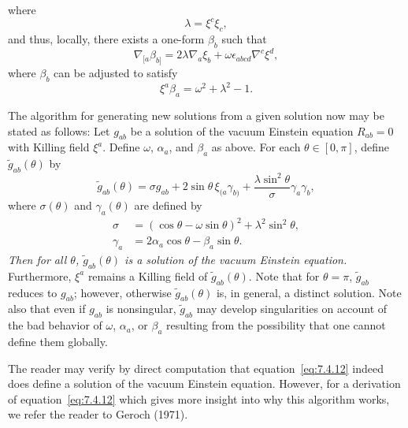 where
\begin{equation}
  \lambda=\xi^c\xi_c ,
  \tag{7.4.9}\label{eq:7.4.9}
\end{equation}
and thus, locally, there exists a one-form \(\beta_b\) such that
\begin{equation}
  \nabla_{[a}\beta_{b]}
    =2\lambda\nabla_a\xi_b
      +\omega\epsilon_{abcd}\nabla^c\xi^d ,
  \tag{7.4.10}\label{eq:7.4.10}
\end{equation}
where \(\beta_b\) can be adjusted to satisfy
\begin{equation}
  \xi^a\beta_a=\omega^2+\lambda^2-1 .
  \tag{7.4.11}\label{eq:7.4.11}
\end{equation}

The algorithm for generating new solutions from a given solution now may be stated
as follows: Let \(g_{ab}\) be a solution of the vacuum Einstein equation \(R_{ab}=0\)
with Killing field \(\xi^a\). Define \(\omega\), \(\alpha_a\), and \(\beta_a\) as
above. For each \(\theta\in[0,\pi]\), define \(\widetilde g_{ab}(\theta)\) by
\begin{equation}
  \widetilde g_{ab}(\theta)
    =\sigma g_{ab}
      +2\sin\theta\,\xi_{(a}\gamma_{b)}
      +\frac{\lambda\sin^2\theta}{\sigma}\gamma_a\gamma_b ,
  \tag{7.4.12}\label{eq:7.4.12}
\end{equation}
where \(\sigma(\theta)\) and \(\gamma_a(\theta)\) are defined by
\begin{align}
  \sigma&=(\cos\theta-\omega\sin\theta)^2
    +\lambda^2\sin^2\theta ,
  \tag{7.4.13}\label{eq:7.4.13}\\
  \gamma_a&=2\alpha_a\cos\theta-\beta_a\sin\theta .
  \tag{7.4.14}\label{eq:7.4.14}
\end{align}
\emph{Then for all \(\theta\), \(\widetilde g_{ab}(\theta)\) is a solution of the
vacuum Einstein equation.} Furthermore, \(\xi^a\) remains a Killing field of
\(\widetilde g_{ab}(\theta)\). Note that for \(\theta=\pi\),
\(\widetilde g_{ab}\) reduces to \(g_{ab}\); however, otherwise
\(\widetilde g_{ab}(\theta)\) is, in general, a distinct solution. Note also that
even if \(g_{ab}\) is nonsingular, \(\widetilde g_{ab}\) may develop singularities
on account of the bad behavior of \(\omega\), \(\alpha_a\), or \(\beta_a\)
resulting from the possibility that one cannot define them globally.

The reader may verify by direct computation that equation~\eqref{eq:7.4.12} indeed
does define a solution of the vacuum Einstein equation. However, for a derivation of
equation~\eqref{eq:7.4.12} which gives more insight into why this algorithm works,
we refer the reader to Geroch (1971).

